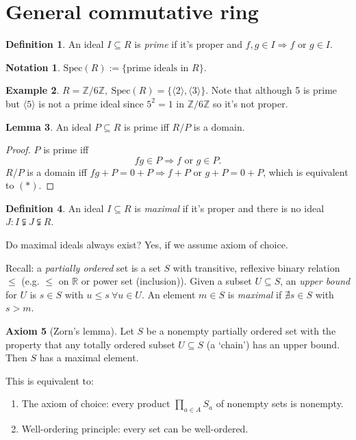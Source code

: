 \documentclass[a4paper]{article}
\newcommand{\Spec}{\text{Spec}}
\theoremstyle{definition}
\newtheorem{defn}{Definition}[subsection]
\newtheorem{lemma}[defn]{Lemma}
\newtheorem{example}[defn]{Example}
\newtheorem{axiom}[defn]{Axiom}
\newtheorem*{notation}{Notation}
\begin{document}
\section{General commutative ring}
\begin{defn}
An ideal $I\subseteq R$ is \textit{prime} if it's proper and $f,g\in I\Rightarrow f$ or $g\in I$.
\end{defn}
\begin{notation}
$\Spec(R):=\{\text{prime ideals in }R\}$.
\end{notation}
\begin{example}
$R=\mathbb Z/6\mathbb Z,\ \Spec(R)=\{\langle 2\rangle,\langle 3\rangle\}$.  Note that although 5 is prime but $\langle 5\rangle$ is not a prime ideal since $5^2=1$ in $\mathbb Z/6\mathbb Z$ so it's not proper.
\end{example}
\begin{lemma}
An ideal $P\subseteq R$ is prime iff $R/P$ is a domain.
\end{lemma}
\begin{proof}
$P$ is prime iff
\[
fg\in P\Rightarrow f \text{ or } g\in P. \tag{$\ast$}
\]
$R/P$ is a domain iff $fg+P=0+P \Rightarrow f+P$ or $g+P=0+P$, which is equivalent to $(\ast)$.
\end{proof}

\begin{defn}
An ideal $I\subseteq R$ is \textit{maximal} if it's proper and there is no ideal $J:I\subsetneqq J\subsetneqq R$.
\end{defn}

Do maximal ideals always exist? Yes, if we assume axiom of choice.

Recall: a \textit{partially ordered} set is a set $S$ with transitive, reflexive binary relation $\leq$ (e.g. $\leq$ on $\mathbb R$ or power set (inclusion)). Given a subset $U\subseteq S$, an \textit{upper bound} for $U$ is $s\in S$ with $u\leq s \ \forall u\in U$. An element $m\in S$ is \textit{maximal} if $\nexists s\in S$ with $s>m$.

\begin{axiom}[Zorn's lemma]
Let $S$ be a nonempty partially ordered set with the property that any totally ordered subset $U\subseteq S$ (a `chain') has an upper bound. Then $S$ has a maximal element.
\end{axiom}

This is equivalent to:
\begin{enumerate}
\item The axiom of choice: every product $\prod_{a\in A} S_a$ of nonempty sets is nonempty.
\item Well-ordering principle: every set can be well-ordered.
\end{enumerate}
\end{document}
